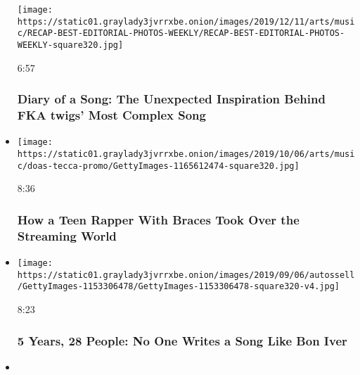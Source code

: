 \begin{itemize}
  \texttt{[image: https://static01.graylady3jvrrxbe.onion/images/2019/12/11/arts/music/RECAP-BEST-EDITORIAL-PHOTOS-WEEKLY/RECAP-BEST-EDITORIAL-PHOTOS-WEEKLY-square320.jpg]}

  6:57

  \hypertarget{diary-of-a-song-the-unexpected-inspiration-behind-fka-twigs-most-complex-song}{%
  \subsubsection{Diary of a Song: The Unexpected Inspiration Behind FKA
  twigs' Most Complex
  Song}\label{diary-of-a-song-the-unexpected-inspiration-behind-fka-twigs-most-complex-song}}
\item
  \href{https://www.nytimes3xbfgragh.onion/video/arts/music/100000006686500/lil-tecca-ransom.html?action=click\&module=video-series-bar\&region=header\&pgtype=Article\&playlistId=video/diaryofasong}{}

  \texttt{[image: https://static01.graylady3jvrrxbe.onion/images/2019/10/06/arts/music/doas-tecca-promo/GettyImages-1165612474-square320.jpg]}

  8:36

  \hypertarget{how-a-teen-rapper-with-braces-took-over-the-streaming-world}{%
  \subsubsection{How a Teen Rapper With Braces Took Over the Streaming
  World}\label{how-a-teen-rapper-with-braces-took-over-the-streaming-world}}
\item
  \href{https://www.nytimes3xbfgragh.onion/video/arts/music/100000006630077/bon-iver-imi.html?action=click\&module=video-series-bar\&region=header\&pgtype=Article\&playlistId=video/diaryofasong}{}

  \texttt{[image: https://static01.graylady3jvrrxbe.onion/images/2019/09/06/autossell/GettyImages-1153306478/GettyImages-1153306478-square320-v4.jpg]}

  8:23

  \hypertarget{5-years-28-people-no-one-writes-a-song-like-bon-iver}{%
  \subsubsection{5 Years, 28 People: No One Writes a Song Like Bon
  Iver}\label{5-years-28-people-no-one-writes-a-song-like-bon-iver}}
\item
  \href{https://www.nytimes3xbfgragh.onion/video/arts/music/100000006486498/rosalia-j-balvin-con-altura.html?action=click\&module=video-series-bar\&region=header\&pgtype=Article\&playlistId=video/diaryofasong}{}


\end{itemize}
